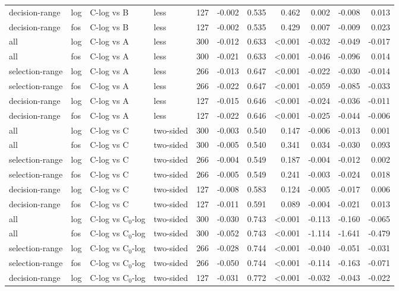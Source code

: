 \begin{longtable}{llllrrrrrrr}
decision-range & log & C-log vs B & less & 127 & -0.002 & 0.535 & 0.462 & 0.002 & -0.008 & 0.013 \\
decision-range & fos & C-log vs B & less & 127 & -0.002 & 0.535 & 0.429 & 0.007 & -0.009 & 0.023 \\
all & log & C-log vs A & less & 300 & -0.012 & 0.633 & <0.001 & -0.032 & -0.049 & -0.017 \\
all & fos & C-log vs A & less & 300 & -0.021 & 0.633 & <0.001 & -0.046 & -0.096 & 0.014 \\
selection-range & log & C-log vs A & less & 266 & -0.013 & 0.647 & <0.001 & -0.022 & -0.030 & -0.014 \\
selection-range & fos & C-log vs A & less & 266 & -0.022 & 0.647 & <0.001 & -0.059 & -0.085 & -0.033 \\
decision-range & log & C-log vs A & less & 127 & -0.015 & 0.646 & <0.001 & -0.024 & -0.036 & -0.011 \\
decision-range & fos & C-log vs A & less & 127 & -0.022 & 0.646 & <0.001 & -0.025 & -0.044 & -0.006 \\
all & log & C-log vs C & two-sided & 300 & -0.003 & 0.540 & 0.147 & -0.006 & -0.013 & 0.001 \\
all & fos & C-log vs C & two-sided & 300 & -0.005 & 0.540 & 0.341 & 0.034 & -0.030 & 0.093 \\
selection-range & log & C-log vs C & two-sided & 266 & -0.004 & 0.549 & 0.187 & -0.004 & -0.012 & 0.002 \\
selection-range & fos & C-log vs C & two-sided & 266 & -0.005 & 0.549 & 0.241 & -0.003 & -0.024 & 0.018 \\
decision-range & log & C-log vs C & two-sided & 127 & -0.008 & 0.583 & 0.124 & -0.005 & -0.017 & 0.006 \\
decision-range & fos & C-log vs C & two-sided & 127 & -0.011 & 0.591 & 0.089 & -0.004 & -0.021 & 0.013 \\
all & log & C-log vs C$_0$-log & two-sided & 300 & -0.030 & 0.743 & <0.001 & -0.113 & -0.160 & -0.065 \\
all & fos & C-log vs C$_0$-log & two-sided & 300 & -0.052 & 0.743 & <0.001 & -1.114 & -1.641 & -0.479 \\
selection-range & log & C-log vs C$_0$-log & two-sided & 266 & -0.028 & 0.744 & <0.001 & -0.040 & -0.051 & -0.031 \\
selection-range & fos & C-log vs C$_0$-log & two-sided & 266 & -0.050 & 0.744 & <0.001 & -0.114 & -0.163 & -0.071 \\
decision-range & log & C-log vs C$_0$-log & two-sided & 127 & -0.031 & 0.772 & <0.001 & -0.032 & -0.043 & -0.022 \\

\end{longtable}
